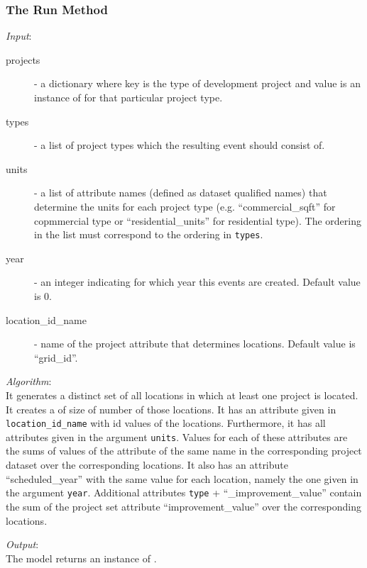 %
\subsubsection{The Run Method}
%
{\it Input}:
\begin{description}
\item[projects] - a dictionary where key is the type of development
  project and value is an instance of  for that
  particular project type.
\item[types] - a list of project types which the resulting event should
  consist of.
\item[units] - a list of attribute  names (defined as dataset qualified names)
  that determine the units for each project type (e.g. ``commercial_sqft'' for
  copmmercial type or ``residential_units'' for residential type). The
  ordering in the list must correspond to the ordering in \verb|types|.
\item[year] - an integer indicating for which year this events are
  created. Default value is 0.
\item[location_id_name] - name of the project attribute that determines
  locations. Default value is ``grid_id''.
\end{description}

{\it Algorithm}:\\[1mm]
It generates a distinct set of all locations in which at least one project is
located. It creates a  of size of number of those
locations. It has an attribute given in \verb|location_id_name| with id values
of the locations. Furthermore, it has all attributes  given in the argument
\verb|units|. Values for each of these attributes  are the sums of values of the
attribute of the same name in the corresponding project dataset over the
corresponding locations. It also has an attribute  ``scheduled_year'' with the
same value for each location, namely the one given in the argument
\verb|year|. Additional attributes \verb|type| + ``_improvement_value''
contain the sum of the project set attribute ``improvement_value'' over the
corresponding locations.

{\it Output}:~\\[1mm]
The model returns an instance of .

